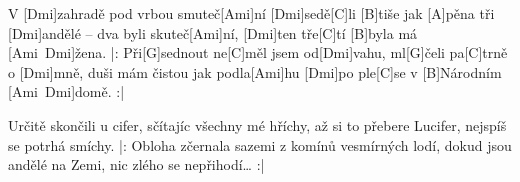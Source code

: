
\sloka
V [Dmi]zahradě pod vrbou smuteč[Ami]ní
[Dmi]sedě[C]li [B]tiše jak [A]pěna
tři [Dmi]andělé – dva byli skuteč[Ami]ní,
[Dmi]ten tře[C]tí [B]byla má [Ami\ Dmi]žena.
|: Při[G]sednout ne[C]měl jsem od[Dmi]vahu,
ml[G]čeli pa[C]trně o [Dmi]mně,
duši mám čistou jak podla[Ami]hu
[Dmi]po ple[C]se v [B]Národním [Ami\ Dmi]domě. :|

\sloka
Určitě skončili u cifer, sčítajíc všechny mé hříchy,
až si to přebere Lucifer, nejspíš se potrhá smíchy.
|: Obloha zčernala sazemi z komínů vesmírných lodí,
dokud jsou andělé na Zemi, nic zlého se nepřihodí… :|

